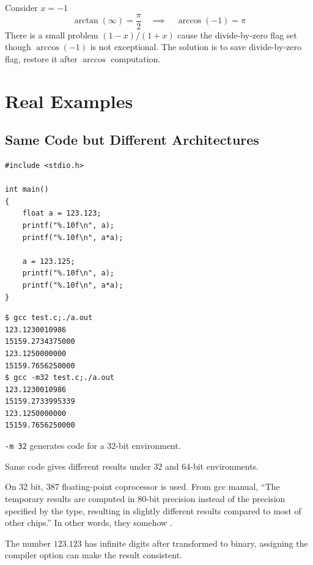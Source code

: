 \vspace{1em}

Consider $x = -1$ \[
    \arctan(\infty) = \frac{\pi}{2} \quad \implies \quad \arccos(-1) = \pi
\]
There is a small problem $(1-x)/(1+x)$ cause the divide-by-zero flag set though $\arccos(-1)$ is not exceptional. The solution is to save divide-by-zero flag, restore it after $\arccos$ computation. 

\newpage

\section{Real Examples}

\subsection{Same Code but Different Architectures}

\begin{verbatim}
#include <stdio.h>

int main()
{
    float a = 123.123;
    printf("%.10f\n", a);
    printf("%.10f\n", a*a);

    a = 123.125;
    printf("%.10f\n", a);
    printf("%.10f\n", a*a);
}
\end{verbatim}

\begin{verbatim}
$ gcc test.c;./a.out
123.1230010986
15159.2734375000
123.1250000000
15159.7656250000
$ gcc -m32 test.c;./a.out
123.1230010986
15159.2733995339
123.1250000000
15159.7656250000
\end{verbatim}

\begin{note}
    \texttt{-m 32} generates code for a 32-bit environment.
\end{note}

Same code gives different results under 32 and 64-bit environments.

\begin{note}
    On 32 bit, 387 floating-point coprocessor is used. From gcc manual, ``The temporary results are computed in 80-bit precision instead of the precision specified by the type, resulting in slightly different results compared to most of other chips.'' In other words, they somehow .

    \vspace{0.5em}

    The number $123.123$ has infinite digits after transformed to binary, assigning the compiler option can make the result consistent.
\end{note}

